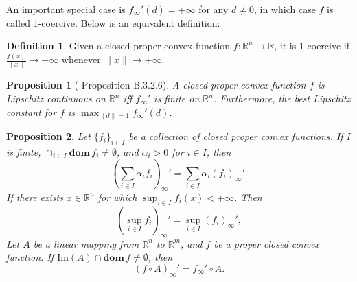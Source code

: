 \documentclass[openany]{book}
\newtheorem{proposition}{Proposition}[chapter]
\theoremstyle{definition}
\newtheorem{definition}{Definition}[chapter]
\theoremstyle{remark}
\begin{document}
An important special case is $f_{\infty}'(d)=+\infty$ for any $d\ne0$, in which case $f$ is called $1$-coercive. Below is an equivalent definition:
\begin{definition}
    Given a closed proper convex function $f:\mathbb{R}^n\to \mathbb{R}$, it is $1$-coercive if $\frac{f(x)}{\|x\|}\to+\infty$ whenever $\|x\|\to+\infty$.
\end{definition}

\begin{proposition}[\cite{HL12} Proposition B.3.2.6]
    A closed proper convex function $f$ is Lipschitz continuous on $\mathbb{R}^n$ iff $f_{\infty}'$ is finite on $\mathbb{R}^n$. Furthermore, the best Lipschitz constant for $f$ is $\max_{\|d\|=1}f_{\infty}'(d)$.
\end{proposition}
\begin{proposition}
    Let $\{f_i\}_{i\in I}$ be a collection of closed proper convex functions. If $I$ is finite, $\cap_{i\in I}\mathbf{dom}\,f_i\ne\emptyset$, and $\alpha_i>0$ for $i\in I$, then
    \begin{equation*}
        \left(\sum_{i\in I}^{}\alpha_if_i\right)_{\infty}'=\sum_{i\in I}^{}\alpha_i(f_i)_{\infty}'.
    \end{equation*}
    If there exists $x\in \mathbb{R}^n$ for which $\sup_{i\in I}f_i(x)<+\infty$. Then
    \begin{equation*}
        \left(\sup_{i\in I}f_i\right)_{\infty}'=\sup_{i\in I}(f_i)_{\infty}',
    \end{equation*}
    Let $A$ be a linear mapping from $\mathbb{R}^n$ to $\mathbb{R}^m$, and $f$ be a proper closed convex function. If $\mathrm{Im}(A)\cap \mathbf{dom}\,f\ne\emptyset$, then
    \begin{equation*}
        (f\circ A)_{\infty}'=f_{\infty}'\circ A.
    \end{equation*}

\end{proposition}
\end{document}

